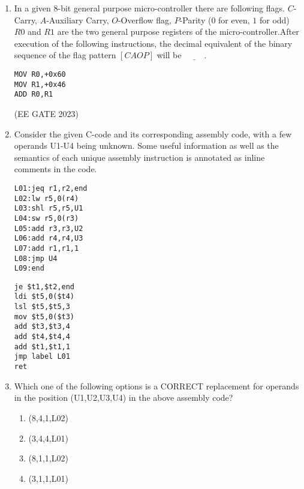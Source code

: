 \begin{enumerate}
\item In a given $8$-bit general purpose micro-controller there are following flags. $C$-Carry, $A$-Auxiliary Carry, $O$-Overflow flag, $P$-Parity ($0$ for even, $1$ for odd) $R0$ and $R1$ are the two general purpose registers of the micro-controller.After execution of the following instructions, the decimal equivalent of the binary sequence of the flag pattern $[CAOP]$ will be $\underline{\hspace{1cm}}$.\\


\begin{lstlisting}
MOV R0,+0x60
MOV R1,+0x46 
ADD R0,R1
\end{lstlisting}
    
\hfill{(EE GATE 2023)}\\


\item 
Consider the given C-code and its corresponding assembly code, with a few operands U1-U4 being unknown. Some useful information as well as the semantics of each unique assembly instruction is annotated as inline comments in the code.  

\begin{lstlisting}
L01:jeq r1,r2,end
L02:lw r5,0(r4)
L03:shl r5,r5,U1
L04:sw r5,0(r3)
L05:add r3,r3,U2
L06:add r4,r4,U3
L07:add r1,r1,1
L08:jmp U4
L09:end
\end{lstlisting}


\begin{lstlisting}
je $t1,$t2,end
ldi $t5,0($t4)
lsl $t5,$t5,3
mov $t5,0($t3)
add $t3,$t3,4
add $t4,$t4,4
add $t1,$t1,1
jmp label L01
ret
\end{lstlisting}

\item Which one of the following options is a CORRECT replacement 
for operands in the position (U1,U2,U3,U4) in the above 
assembly code?

\begin{enumerate}
\item (8,4,1,L02)                      
\item (3,4,4,L01)
\item (8,1,1,L02)                             
\item (3,1,1,L01)         
\end{enumerate}

\end{enumerate}

